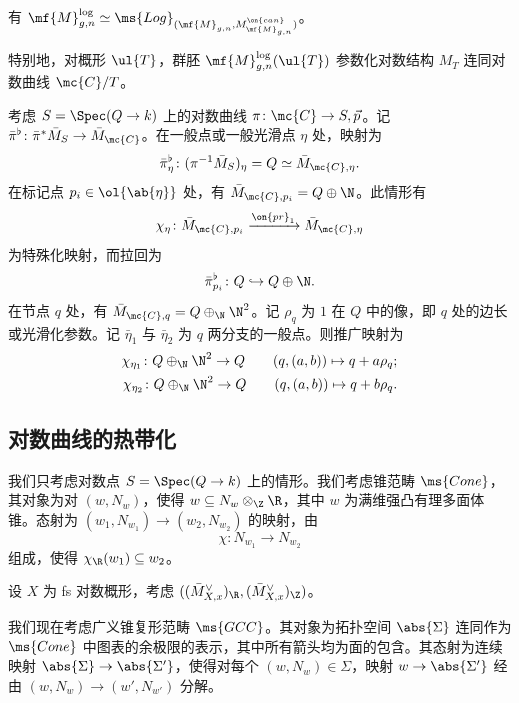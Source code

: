 \begin{prop}
    有 \(\mf{M}_{g,n}^{\log} \simeq \ms{Log}_{(\mf{M}_{g,n}, M_{\mf{M}_{g,n}}^{\on{can}})}\)。
\end{prop}

特别地，对概形 \(\ul{T}\)，群胚 \(\mf{M}_{g,n}^{\log}(\ul{T})\) 参数化对数结构 \(M_T\) 连同对数曲线 \(\mc{C} / T\)。

考虑 \(S = \Spec (Q \to k)\) 上的对数曲线 \(\pi \colon \mc{C} \to S, \vec{p}\)。记 \(\bar{\pi}^{\flat} \colon \bar{\pi}^* \bar{M}_S \to \bar{M}_{\mc{C}}\)。在一般点或一般光滑点 \(\eta\) 处，映射为
\[ \bar{\pi}_{\eta}^{\flat} \colon (\pi^{-1} \bar{M}_S)_{\eta} = Q \simeq \bar{M}_{\mc{C}, \eta}. \]
在标记点 \(p_i \in \ol{\ab\{\eta\}}\) 处，有 \(\bar{M}_{\mc{C}, p_i} = Q \oplus \N\)。此情形有
\[ \chi_{\eta} \colon \bar{M}_{\mc{C}, p_i} \xrightarrow{\on{pr}_1} \bar{M}_{\mc{C}, \eta} \]
为特殊化映射，而拉回为
\[ \bar{\pi}_{p_i}^{\flat} \colon Q \hookrightarrow Q \oplus \N. \]
在节点 \(q\) 处，有 \(\bar{M}_{\mc{C}, q} = Q \oplus_{\N} \N^2\)。记 \(\rho_q\) 为 \(1\) 在 \(Q\) 中的像，即 \(q\) 处的边长或光滑化参数。记 \(\bar{\eta}_1\) 与 \(\bar{\eta}_2\) 为 \(q\) 两分支的一般点。则推广映射为
\begin{align*}
    \chi_{\eta_1} \colon Q \oplus_{\N} \N^2 \to Q \qquad (q, (a,b)) \mapsto q + a \rho_q ;\\
    \chi_{\eta_2} \colon Q \oplus_{\N} \N^2 \to Q \qquad (q, (a,b)) \mapsto q + b \rho_q .
\end{align*}

\subsection{对数曲线的热带化}%
\label{sub:Tropicalization of log curves}

我们只考虑对数点 \(S = \Spec(Q \to k)\) 上的情形。我们考虑锥范畴 \(\ms{Cone}\)，其对象为对 \((w, N_w)\)，使得 \(w \subseteq N_w \otimes_{\Z} \R\)，其中 \(w\) 为满维强凸有理多面体锥。态射为 \((w_1, N_{w_1}) \to (w_2, N_{w_2})\) 的映射，由
\[ \chi \colon N_{w_1} \to N_{w_2} \]
组成，使得 \(\chi_{\R}(w_1) \subseteq w_2\)。

\begin{exm}
    设 \(X\) 为 fs 对数概形，考虑 \(( (\bar{M}_{X,x}^{\vee})_{\R}, (\bar{M}_{X,x}^{\vee})_{\Z} )\)。
\end{exm}

我们现在考虑广义锥复形范畴 \(\ms{GCC}\)。其对象为拓扑空间 \(\abs{\Sigma}\) 连同作为 \(\ms{Cone}\) 中图表的余极限的表示，其中所有箭头均为面的包含。其态射为连续映射 \(\abs{\Sigma} \to \abs{\Sigma'}\)，使得对每个 \((w, N_w) \in \Sigma\)，映射 \(w \to \abs{\Sigma'}\) 经由 \((w, N_w) \to (w', N_{w'})\) 分解。


